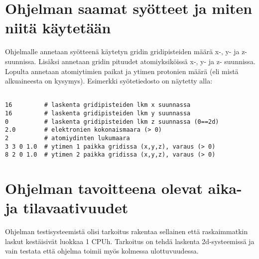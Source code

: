 \documentclass{article}
\begin{document}
\section{Ohjelman saamat syötteet ja miten niitä käytetään}
Ohjelmalle annetaan syötteenä käytetyn gridin gridipisteiden määrä x-,
y- ja z- suunnissa. Lisäksi annetaan gridin pituudet atomiyksiköissä
x-, y- ja z- suunnissa. Lopulta annetaan atomiytimien paikat ja ytimen
protonien määrä (eli mistä alkuaineesta on kysymys). Esimerkki
syötetiedosto on näytetty alla:
\begin{small}
\begin{lstlisting}[frame=single]  % Start your code-block

16         # laskenta gridipisteiden lkm x suunnassa 
16         # laskenta gridipisteiden lkm y suunnassa 
0          # laskenta gridipisteiden lkm z suunnassa (0==2d)
2.0        # elektronien kokonaismaara (> 0)
2          # atomiydinten lukumaara
3 3 0 1.0  # ytimen 1 paikka gridissa (x,y,z), varaus (> 0)
8 2 0 1.0  # ytimen 2 paikka gridissa (x,y,z), varaus (> 0)
\end{lstlisting}
\end{small}


\section{Ohjelman tavoitteena olevat aika- ja tilavaativuudet}
Ohjelman testisysteemistä olisi tarkoitus rakentaa sellainen että
raskaimmatkin laskut kestäisivät luokkaa 1 CPUh. Tarkoitus on tehdä
laskenta 2d-systeemissä ja vain testata että ohjelma toimii myös
kolmessa ulottuvuudessa.






\end{document}
